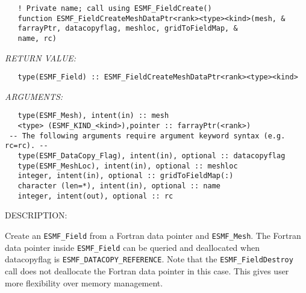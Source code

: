    
\begin{verbatim}   ! Private name; call using ESMF_FieldCreate() 
   function ESMF_FieldCreateMeshDataPtr<rank><type><kind>(mesh, & 
   farrayPtr, datacopyflag, meshloc, gridToFieldMap, & 
   name, rc) 
   \end{verbatim}{\em RETURN VALUE:}
\begin{verbatim}   type(ESMF_Field) :: ESMF_FieldCreateMeshDataPtr<rank><type><kind> 
   \end{verbatim}{\em ARGUMENTS:}
\begin{verbatim}   type(ESMF_Mesh), intent(in) :: mesh 
   <type> (ESMF_KIND_<kind>),pointer :: farrayPtr(<rank>) 
 -- The following arguments require argument keyword syntax (e.g. rc=rc). --
   type(ESMF_DataCopy_Flag), intent(in), optional :: datacopyflag 
   type(ESMF_MeshLoc), intent(in), optional :: meshloc 
   integer, intent(in), optional :: gridToFieldMap(:) 
   character (len=*), intent(in), optional :: name 
   integer, intent(out), optional :: rc 
   \end{verbatim}
{\sf DESCRIPTION:\\ }

 
   Create an {\tt ESMF\_Field} from a Fortran data pointer and {\tt ESMF\_Mesh}. 
   The Fortran data pointer inside {\tt ESMF\_Field} can be queried and deallocated when 
   datacopyflag is {\tt ESMF\_DATACOPY\_REFERENCE}. Note that the {\tt ESMF\_FieldDestroy} call does not 
   deallocate the Fortran data pointer in this case. This gives user more flexibility over memory management. 
   
